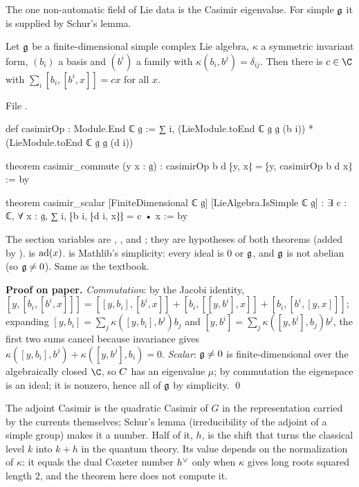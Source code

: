 The one non-automatic field of Lie data is the Casimir eigenvalue. For simple $\mathfrak g$ it is supplied by Schur's lemma.

\begin{theorem}\label{l23:thm:casimir}
Let $\mathfrak g$ be a finite-dimensional simple complex Lie algebra, $\kappa$ a symmetric invariant form, $(b_i)$ a basis and
$(b^i)$ a family with $\kappa(b_i,b^j)=\delta_{ij}$. Then there is $c\in\C$ with $\sum_i[b_i,[b^i,x]]=cx$ for all $x$.
\end{theorem}
\noindent File .
\begin{leancode}
def casimirOp : Module.End ℂ 𝔤 :=
  ∑ i, (LieModule.toEnd ℂ 𝔤 𝔤 (b i)) * (LieModule.toEnd ℂ 𝔤 𝔤 (d i))

theorem casimir_commute (y x : 𝔤) : casimirOp b d ⁅y, x⁆ = ⁅y, casimirOp b d x⁆ := by

theorem casimir_scalar [FiniteDimensional ℂ 𝔤] [LieAlgebra.IsSimple ℂ 𝔤] :
    ∃ c : ℂ, ∀ x : 𝔤, ∑ i, ⁅b i, ⁅d i, x⁆⁆ = c • x := by
\end{leancode}

\begin{dictionary}
The section variables are , ,  and
; they are hypotheses of both theorems (added by
).  is $\operatorname{ad}(x)$.  is Mathlib's
simplicity: every ideal is $0$ or $\mathfrak g$, and $\mathfrak g$ is not abelian (so $\mathfrak g\ne0$). Same as the textbook.
\end{dictionary}

\textbf{Proof on paper.} \emph{Commutation}: by the Jacobi identity,
$[y,[b_i,[b^i,x]]]=[[y,b_i],[b^i,x]]+[b_i,[[y,b^i],x]]+[b_i,[b^i,[y,x]]]$; expanding $[y,b_i]=\sum_j\kappa([y,b_i],b^j)b_j$ and
$[y,b^i]=\sum_j\kappa([y,b^i],b_j)b^j$, the first two sums cancel because invariance gives
$\kappa([y,b_i],b^j)+\kappa([y,b^j],b_i)=0$. \emph{Scalar}: $\mathfrak g\ne0$ is finite-dimensional over the algebraically
closed $\C$, so $C$ has an eigenvalue $\mu$; by commutation the eigenspace is an ideal; it is nonzero, hence all of
$\mathfrak g$ by simplicity. \qed

\begin{physics}
The adjoint Casimir is the quadratic Casimir of $G$ in the representation carried by the currents themselves; Schur's
lemma (irreducibility of the adjoint of a simple group) makes it a number. Half of it, $h$, is the shift that turns the
classical level $k$ into $k+h$ in the quantum theory. Its value depends on the normalization of $\kappa$: it equals the dual
Coxeter number $h^\vee$ only when $\kappa$ gives long roots squared length $2$, and the theorem here does not compute it.
\end{physics}

